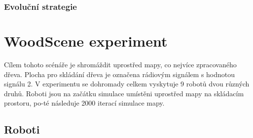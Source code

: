 \subsubsection{Evoluční strategie}


\section{WoodScene experiment}
Cílem tohoto scénáře je shromáždit uprostřed mapy, co nejvíce zpracovaného dřeva. Plocha pro skládání dřeva je označena rádiovým signálem s hodnotou signálu 2. V experimentu se dohromady celkem vyskytuje 9 robotů dvou různých druhů. Roboti jsou na začátku simulace umístěni uprostřed mapy na skládacím prostoru, po-té následuje 2000 iterací simulace mapy. 

\subsection{Roboti}
